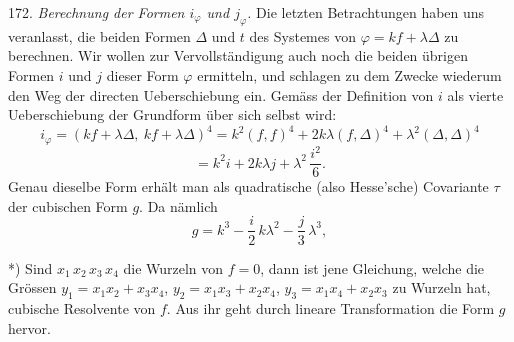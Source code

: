 \documentclass[11pt]{article}
\begin{document}
172. \textit{Berechnung der Formen $i_\varphi$ und $j_\varphi$.} Die letzten Betrachtungen
haben uns veranlasst, die beiden Formen $\varDelta$ und $t$ des Systemes von
$\varphi = kf + \lambda\varDelta$ zu berechnen. Wir wollen zur Vervollständigung auch
noch die beiden übrigen Formen $i$ und $j$ dieser Form $\varphi$ ermitteln,
und schlagen zu dem Zwecke wiederum den Weg der directen Ueberschiebung ein. Gemäss der Definition von $i$ als vierte Ueberschiebung
der Grundform über sich selbst wird:
\[
i_\varphi = (kf+\lambda\varDelta,\ kf+\lambda\varDelta)^4 = k^2(f,f)^4 + 2k\lambda(f,\varDelta)^4 + \lambda^2(\varDelta,\varDelta)^4
\]
\[
= k^2 i + 2k\lambda j + \lambda^2\,\frac{i^2}{6}.
\]
Genau dieselbe Form erhält man als quadratische (also Hesse'sche)
Covariante $\tau$ der cubischen Form $g$. Da nämlich
\[
g = k^3 - \frac{i}{2}\,k\lambda^2 - \frac{j}{3}\,\lambda^3,
\]

*) Sind $x_1\,x_2\,x_3\,x_4$ die Wurzeln von $f=0$, dann ist jene Gleichung, welche
die Grössen $y_1 = x_1x_2+x_3x_4$, $y_2 = x_1x_3+x_2x_4$, $y_3 = x_1x_4+x_2x_3$ zu Wurzeln
hat, cubische Resolvente von $f$. Aus ihr geht durch lineare Transformation die
Form $g$ hervor.
\end{document}
